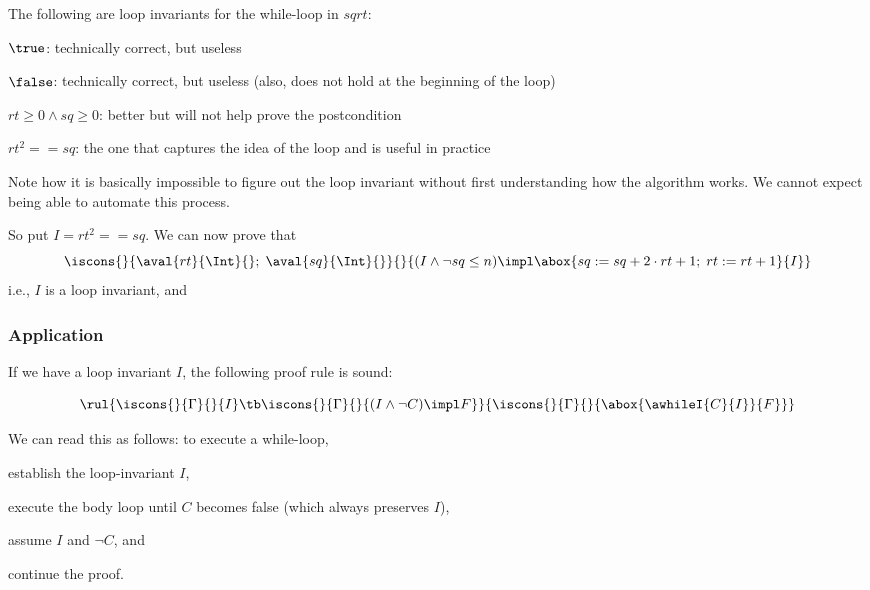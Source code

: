 \begin{example}\label{ex:sd:sqrt3}
The following are loop invariants for the while-loop in $sqrt$:
\begin{compactitem}
 \item $\true$: technically correct, but useless
 \item $\false$: technically correct, but useless (also, does not hold at the beginning of the loop)
 \item $rt\geq 0 \wedge sq \geq 0$: better but will not help prove the postcondition
 \item $rt^2==sq$: the one that captures the idea of the loop and is useful in practice
\end{compactitem}

Note how it is basically impossible to figure out the loop invariant without first understanding how the algorithm works.
We cannot expect being able to automate this process.

So put $I=rt^2==sq$.
We can now prove that
\[\iscons{}{\aval{rt}{\Int}{};\;\aval{sq}{\Int}{}}{}{(I\wedge \neg sq\leq n)\impl \abox{sq := sq + 2\cdot rt + 1;\;rt := rt + 1}{I}}\]
i.e., $I$ is a loop invariant, and
\end{example}

\subsubsection{Application}

If we have a loop invariant $I$, the following proof rule is sound:

\[\rul{\iscons{}{\Gamma}{}{I} \tb \iscons{}{\Gamma}{}{(I\wedge \neg C) \impl F}}
      {\iscons{}{\Gamma}{}{\abox{\awhileI{C}{I}}{F}}}\]

We can read this as follows:
to execute a while-loop,
\begin{compactenum}
 \item establish the loop-invariant $I$,
 \item execute the body loop until $C$ becomes false (which always preserves $I$),
 \item assume $I$ and $\neg C$, and
 \item continue the proof.
\end{compactenum}


